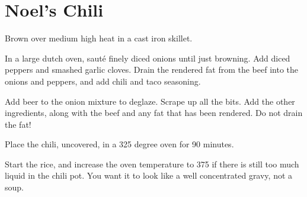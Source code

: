 \section{Noel's Chili}
\begin{recipe}



Brown over medium high heat in a cast iron skillet.


In a large dutch oven, sauté finely diced onions until just browning. Add diced peppers and smashed garlic cloves. Drain the rendered fat from the beef into the onions and peppers, and add chili and taco seasoning.



Add beer to the onion mixture to deglaze. Scrape up all the bits. Add the other ingredients, along with the beef and any fat that has been rendered. Do not drain the fat!

Place the chili, uncovered, in a 325 degree oven for 90 minutes.


Start the rice, and increase the oven temperature to 375 if there is still too much liquid in the chili pot. You want it to look like a well concentrated gravy, not a soup.


\end{recipe}
